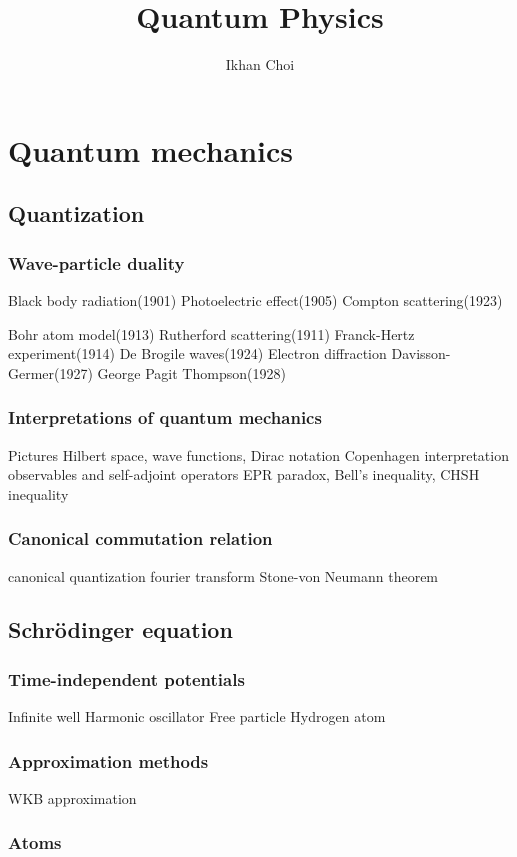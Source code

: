 \documentclass{../note}
\begin{document}
\title{Quantum Physics}
\author{Ikhan Choi}
\maketitle
\tableofcontents

\part{Quantum mechanics}
\chapter{Quantization}
\section{Wave-particle duality}
Black body radiation(1901)
Photoelectric effect(1905)
Compton scattering(1923)

Bohr atom model(1913)
	Rutherford scattering(1911)
	Franck-Hertz experiment(1914)
De Brogile waves(1924)
Electron diffraction
	Davisson-Germer(1927)
	George Pagit Thompson(1928)
\section{Interpretations of quantum mechanics}
Pictures
Hilbert space, wave functions, Dirac notation
	Copenhagen interpretation
observables and self-adjoint operators
EPR paradox, Bell's inequality, CHSH inequality
\section{Canonical commutation relation}
canonical quantization
fourier transform
Stone-von Neumann theorem

\chapter{Schr\"odinger equation}
\section{Time-independent potentials}
Infinite well
Harmonic oscillator
Free particle
Hydrogen atom
\section{Approximation methods}
WKB approximation
\section{Atoms}
\end{document}
